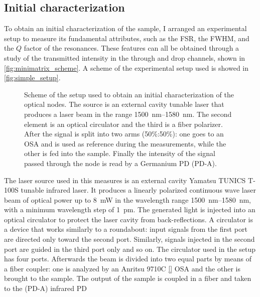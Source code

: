 \subsection{Initial characterization}
\label{ssec:initial_characterization}

To obtain an initial characterization of the sample, I arranged an experimental setup to measure its fundamental attributes, such as the \acf{FSR}, the \acf{FWHM}, and the $Q$ factor of the resonances.
These features can all be obtained through a study of the transmitted intensity in the through and drop channels, shown in \autoref{fig:minimatrix_scheme}.
A scheme of the experimental setup used is showed in \autoref{fig:simple_setup}.

\begin{figure}
	\centering
	
	\caption{Scheme of the setup used to obtain an initial characterization of the optical nodes.
		The source is an external cavity tunable laser that produces a laser beam in the range \SIrange{1500}{1580}{\nm}.
		The second element is an optical circulator and the third is a fiber polarizer.
		After the signal is split into two arms (50\%:50\%): one goes to an \acs{OSA} and is used as reference during the measurements, while the other is fed into the sample.
		Finally the intensity of the signal passed through the node is read by a Germanium \acs{PD} (PD-A).
		}
	\label{fig:simple_setup}
\end{figure}

The laser source used in this measures is an external cavity Yamatsu TUNICS T-100S tunable infrared laser.
It produces a linearly polarized continuous wave laser beam of optical power up to \SI{8}{\mW} in the wavelength range \SIrange{1500}{1580}{\nm}, with a minimum wavelength step of \SI{1}{\pm}.
The generated light is injected into an optical circulator to protect the laser cavity from back-reflections.
A circulator is a device that works similarly to a roundabout: input signals from the first port are directed only toward the second port. Similarly, signals injected in the second port are guided in the third port only and so on.
The circulator used in the setup has four ports.
Afterwards the beam is divided into two equal parts by means of a fiber coupler: one is analyzed by an Anritsu 9710C \ref{} \acf{OSA} and the other is brought to the sample.
The output of the sample is coupled in a fiber and taken to the (PD-A) infrared \ac{PD}

